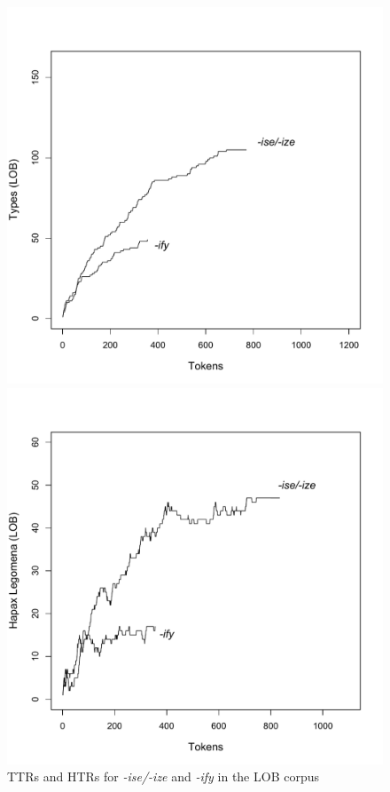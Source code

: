 \begin{figure}
\caption{TTRs and HTRs for \textit{-ise/-ize} and \textit{-ify} in the LOB corpus}
\label{fig:izettrhtr}
\begin{minipage}{.5\textwidth}
 \centering
 \includegraphics[width=\textwidth]{figures/lobiseifytypes}
\end{minipage}%
\begin{minipage}{.5\textwidth}
 \centering
 \includegraphics[width=\textwidth]{figures/lobiseifyhapaxes}
\end{minipage}
\end{figure}

